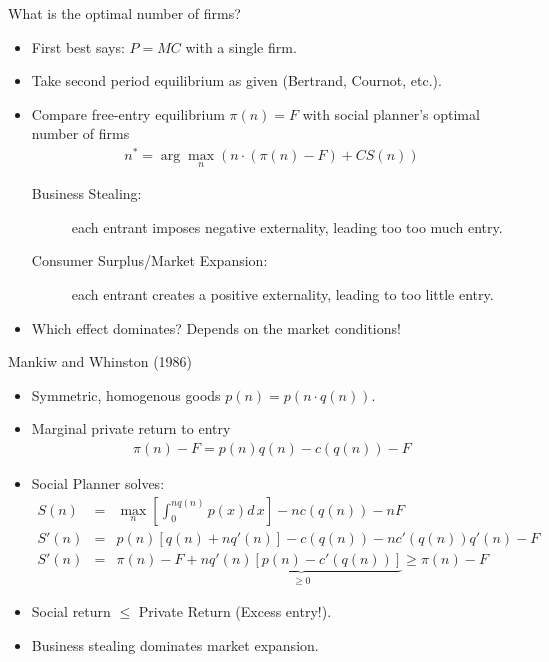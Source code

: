 \begin{frame}{What is the optimal number of firms?}
\begin{itemize}
\item First best says: $P=MC$ with a single firm.
\item Take second period equilibrium as given (Bertrand, Cournot, etc.).
\item Compare free-entry equilibrium $\pi(n) =F$ with social planner's optimal number of firms
\begin{eqnarray*}
n^* = \arg \max_n \left (n \cdot (\pi(n) - F)  + CS(n) \right)
\end{eqnarray*}
\begin{description}
\item[Business Stealing:] each entrant imposes \alert{negative} externality, leading too too much entry.
\item[Consumer Surplus/Market Expansion:] each entrant creates a \alert{positive} externality, leading to too little entry.
\end{description}
\item Which effect dominates? Depends on the market conditions!
\end{itemize}
\end{frame} 

\begin{frame}{Mankiw and Whinston (1986)}
\begin{itemize}
\item Symmetric, homogenous goods $p(n) = p( n \cdot q(n))$.
\item Marginal private return to entry
\begin{eqnarray*}
\pi(n) - F = p(n) q(n) - c(q(n)) - F
\end{eqnarray*}
\item Social Planner solves:
\begin{eqnarray*}
S(n) &=& \max_n \left[ \int_0^{n q(n)} p(x) d\,x \right] - n c(q(n)) - nF \\
S'(n) &=&  p(n) [ q(n) + nq'(n)] - c(q(n)) - nc'(q(n)) q'(n) - F\\
S'(n) &=&  \pi(n) - F  + \underbrace{nq'(n) [p(n) - c'(q(n))] }_{\geq 0} \geq \pi(n) - F
\end{eqnarray*}
\item Social return $\leq $ Private Return (Excess entry!).
\item Business stealing dominates market expansion.
\end{itemize}
\end{frame} 

